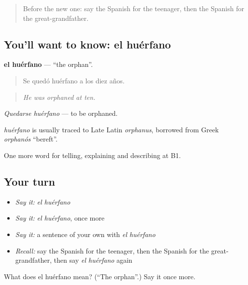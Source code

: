 \label{lesson:ES-C749-huerfano}



\begin{quote}
Before the new one: say the Spanish for the teenager, then the Spanish for the great-grandfather.
\end{quote}

\subsection*{You'll want to know: el huérfano}
\textbf{el huérfano} — \textquotedblleft{}the orphan\textquotedblright{}.

\begin{quote}
Se quedó huérfano a los diez años.
\end{quote}

\begin{quote}
\emph{He was orphaned at ten.}
\end{quote}

\emph{Quedarse huérfano} — to be orphaned.

\begin{cousinweb}
\emph{huérfano} is usually traced to Late Latin \emph{orphanus}, borrowed from Greek \emph{orphanós} \textquotedblleft{}bereft\textquotedblright{}.
\end{cousinweb}

\begin{grammarlens}[title={What you've built}]
One more word for telling, explaining and describing at B1.
\end{grammarlens}

\subsection*{Your turn}
\begin{itemize}
\raggedright
  \item \emph{Say it:} \emph{el huérfano}
  \item \emph{Say it:} \emph{el huérfano}, once more
  \item \emph{Say it:} a sentence of your own with \emph{el huérfano}
  \item \emph{Recall:} say the Spanish for the teenager, then the Spanish for the great-grandfather, then say \emph{el huérfano} again
\end{itemize}

\begin{tcolorbox}[breakable,colback=teal!4,colframe=teal!35!black,title={Before you move on}]
What does el huérfano mean? (\textquotedblleft{}The orphan\textquotedblright{}.) Say it once more.
\end{tcolorbox}
